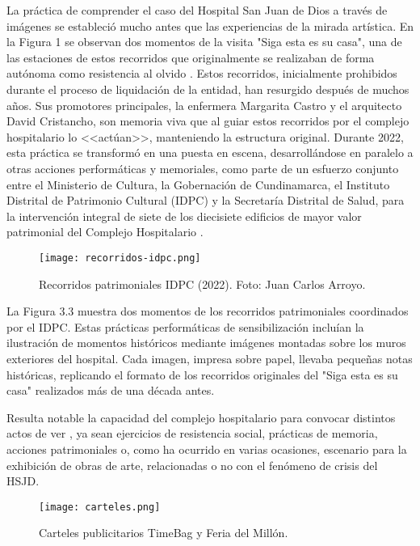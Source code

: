 La práctica de comprender el caso del Hospital San Juan de Dios a través de imágenes se estableció mucho antes que las experiencias de la mirada artística. En la Figura 1 se observan dos momentos de la visita "Siga esta es su casa", una de las estaciones de estos recorridos que originalmente se realizaban de forma autónoma como resistencia al olvido \parencite{Gongora2013}. Estos recorridos, inicialmente prohibidos durante el proceso de liquidación de la entidad, han resurgido después de muchos años. Sus promotores principales, la enfermera Margarita Castro y el arquitecto David Cristancho, son memoria viva que al guiar estos recorridos por el complejo hospitalario lo <<actúan>>, manteniendo la estructura original. Durante 2022, esta práctica se transformó en una puesta en escena, desarrollándose en paralelo a otras acciones performáticas y memoriales, como parte de un esfuerzo conjunto entre el Ministerio de Cultura, la Gobernación de Cundinamarca, el Instituto Distrital de Patrimonio Cultural (IDPC) y la Secretaría Distrital de Salud, para la intervención integral de siete de los diecisiete edificios de mayor valor patrimonial del Complejo Hospitalario \parencite{IDPCSanJuanDeDios}.
    
\begin{figure}[ht]
    \centering
    \texttt{[image: recorridos-idpc.png]}
    \caption{Recorridos patrimoniales IDPC (2022). Foto: Juan Carlos Arroyo.}
\end{figure}

La Figura 3.3 muestra dos momentos de los recorridos patrimoniales coordinados por el IDPC. Estas prácticas performáticas de sensibilización \parencite{Guasch2011} incluían la ilustración de momentos históricos mediante imágenes montadas sobre los muros exteriores del hospital. Cada imagen, impresa sobre papel, llevaba pequeñas notas históricas, replicando el formato de los recorridos originales del "Siga esta es su casa" realizados más de una década antes.

Resulta notable la capacidad del complejo hospitalario para convocar distintos actos de ver \parencite{Abril2007}, ya sean ejercicios de resistencia social, prácticas de memoria, acciones patrimoniales o, como ha ocurrido en varias ocasiones, escenario para la exhibición de obras de arte, relacionadas o no con el fenómeno de crisis del HSJD.

\begin{figure}[ht]
    \centering
    \texttt{[image: carteles.png]}
    \caption{Carteles publicitarios TimeBag y Feria del Millón.}
\end{figure}

